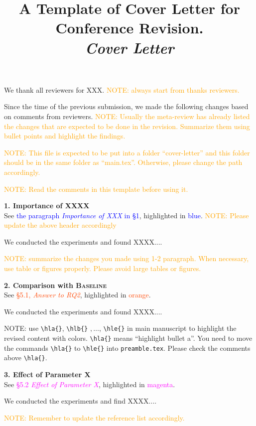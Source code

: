 \documentclass[sigconf,nonacm]{acmart}
\newcommand\hla[1]{{\textcolor{blue}{#1}}}
\newcommand\hlb[1]{{\textcolor{OrangeRed}{#1}}}
\newcommand\hlc[1]{{\textcolor{magenta}{#1}}}
\newcommand\hle[1]{{\textcolor{purple}{#1}}}
\newcommand\hl[1]{{\textcolor{orange}{#1}}}
\begin{document}
\title{ A Template of Cover Letter for Conference Revision.
\\ \textit{Cover Letter}}



\date{}
\maketitle

\thispagestyle{empty}

\newcommand{\mysection}[1]{\S{#1}\xspace}

\newcommand{\requirement}[2]{\vspace*{5pt}\noindent\textbf{#1}\\{\footnotesize See #2}}


We thank all reviewers for XXX.
\hl{NOTE: always start from thanks reviewers.}

Since the time of the previous submission,
we made the following changes based on comments from reviewers.
\hl{NOTE: Usually the meta-review has already listed the changes that are expected to be done in the revision.
Summarize them using bullet points and highlight the findings.}

 \hl{NOTE: This file is expected to be put into a folder ``cover-letter''
 and this folder should be in the same folder as ``main.tex''.
 Otherwise, please change the path accordingly.}

\hl{NOTE: Read the comments in this template before using it.}



\requirement{1. Importance of XXXX}{
    \hla{the paragraph \textit{Importance of XXX} in \mysection{1}}, highlighted in \hla{blue}.
}
\hl{NOTE: Please update the above header accordingly}

We conducted the experiments and found XXXX....

\hl{NOTE: summarize the changes you made using 1-2 paragraph.
When necessary, use table or figures properly.
Please avoid large tables or figures. }


\requirement{2. Comparison with \textsc{Baseline}}{
    \hlb{\mysection{5.1}, \textit{Answer to RQ2}}, highlighted in \hlb{orange}.
}

We conducted the experiments and found XXXX....

NOTE: use \verb!\hla{}!, \verb!\hlb{}! $,\dots$, \verb!\hle{}!
in main manuscript to highlight the revised content with colors.
\verb!\hla{}! means ``highlight bullet a''.
You need to move the commands \verb!\hla{}! to \verb!\hle{}!
into \texttt{preamble.tex}.
Please check the comments above \verb!\hla{}!.



\requirement{3. Effect of Parameter X}
{\hlc{\mysection{5.2} \textit{Effect of Parameter X}}, highlighted in \hlc{magenta}.}

We conducted the experiments and find XXXX....

\hl{NOTE: Remember to update the reference list accordingly.
}





\end{document}
